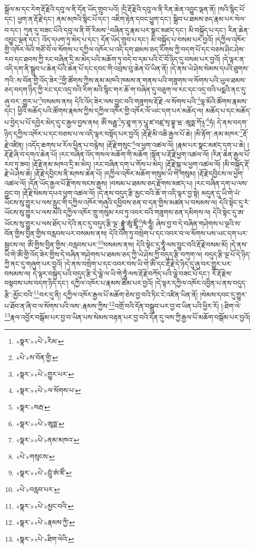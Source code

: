 སྒྲོལ་མ་དང་རེག་རྡོ་རྗེའི་དབུ་ལ་ནི་དོན་ཡོད་གྲུབ་པའོ། །དྲི་རྡོ་རྗེའི་དབུ་ལ་ནི་རིན་ཆེན་འབྱུང་ལྡན་ནོ། །སའི་སྙིང་པོ་དང་། ཕྱག་ན་རྡོ་རྗེ་དང་། ནམ་མཁའི་སྙིང་པོ་དང་། འཇིག་རྟེན་དབང་ཕྱུག་དང་། སྒྲིབ་པ་ཐམས་ཅད་རྣམ་པར་སེལ་བ་དང་། ཀུན་དུ་བཟང་པོའི་དབུ་ལ་ནི་གོ་རིམས་\footnote{«སྣར་»«པེ་»རིམ་}བཞིན་དུ་རྣམ་པར་སྣང་མཛད་དང་། མི་བསྐྱོད་པ་དང་། རིན་ཆེན་འབྱུང་ལྡན་དང་། འོད་དཔག་ཏུ་མེད་པ་དང་། དོན་ཡོད་གྲུབ་པ་དང་། མི་བསྐྱོད་པ་བསམ་པར་བྱའོ། །དཀྱིལ་འཁོར་གྱི་འཁོར་ལོའི་གཙོ་བོ་ལ་སོགས་པ་དཀྱིལ་འཁོར་པ་འདི་དག་ཐམས་ཅད་རིགས་ཀྱི་བདག་པོ་དང་བཅས་ཤིང་ཤེས་རབ་དང་ཐབས་ཀྱི་རང་བཞིན་དྲི་མ་མེད་པའི་མཆོག་ཏུ་བདེ་བ་དམ་པའི་ངོ་བོ་ཉིད་དུ་བསམ་པར་བྱའོ། །དེ་ལྟར་ན་འདི་དག་ནི་སྒྲུབ་པ་ཆེན་པོའི་ཆེན་པོ་དང་དབང་གི་འབྲས་བུ་ཆེན་པོ་ཡིན་ནོ། །དེ་ནས་ཡེ་ཤེས་སེམས་དཔའི་ཐུགས་ཀའི་:ས་བོན་གྱི་འོད་ཟེར་\footnote{«པེ་»ས་བོན་གྱི་}གྱི་ཚོགས་ཀྱིས་ནམ་མཁའི་ཁམས་ན་གནས་པའི་གཟུགས་ལ་སོགས་པའི་ཡུལ་ཐམས་ཅད་བདག་ཉིད་ཀྱི་རང་དང་འདྲ་བའི་རིག་མའི་སྙིང་གར་ཆོ་ག་བཞིན་དུ་བཅུག་ལ་རང་དང་འདྲ་བའི་པདྨའི་ནང་དུ་ཞུ་བར་:གྱུར་པ་\footnote{«སྣར་»«པེ་»གྱུར་པར་}བསམས་ནས། དེའི་འོད་ཟེར་ལས་བྱུང་བའི་གཟུགས་རྡོ་རྗེ་:ལ་སོགས་པའི་\footnote{«སྣར་»«པེ་»ལ་སོགས་པ་}ལྷ་མོའི་ཚོགས་རྣམས་དང་། ཕྱིའི་མཆོད་པའི་ཚོགས་རྣམས་ཀྱིས་དཀྱིལ་འཁོར་གྱི་འཁོར་ལོ་ཡང་དག་པར་མཆོད་ལ། མཆོད་པ་དང་མཆོད་པ་བྱེད་པ་པོ་དབྱེར་མེད་དུ་ང་རྒྱལ་བྱས་ནས། ཨོཾ་སརྦྦ་\footnote{«སྣར་»སརྦ་}ཏ་ཐཱ་ག་ཏ་པཱུ་ཛ་བཛྲ་སྭ་བྷཱ་ཝ་:ཨཱཏྨ་ཀོ྅་\footnote{«སྣར་»«པེ་»ཨཱཏྨ་}ཧཾ། དེ་ནས་བདག་ཉིད་དཀྱིལ་འཁོར་པ་དང་བཅས་པ་ལ་འདི་ལྟར་བསྟོད་པར་བྱའོ། །རྡོ་རྗེ་མི་འཆི་རྒྱལ་པོ་ཆེ། །མི་རྟོག་:ནམ་མཁར་\footnote{«སྣར་»«པེ་»ནམ་མཁའ་}རྡོ་རྗེ་འཛིན། །འདོད་ཆགས་ཕ་རོལ་ཕྱིན་པ་བརྙེས། །རྡོ་རྗེ་གསུང་\footnote{«པེ་»གསུངས་}ལ་ཕྱག་འཚལ་ལོ། །རྣམ་པར་སྣང་མཛད་དག་པ་ཆེ། །རྡོ་རྗེ་ཞི་བ་དགའ་ཆེན་པོ། །རང་བཞིན་འོད་གསལ་མཆོག་གི་མཆོག །སྟོན་པ་རྡོ་རྗེ་ཕྱག་འཚལ་ལོ། །རིན་ཆེན་རྒྱལ་པོ་རབ་ཏུ་ཟབ། །རྡོ་རྗེ་ནམ་མཁའ་དྲི་མ་མེད། །རང་བཞིན་དག་པ་གོས་པ་མེད། །རྡོ་རྗེ་སྐུ་ལ་ཕྱག་འཚལ་ལོ། །མི་བསྐྱོད་རྡོ་རྗེ་ཡེ་ཤེས་ཆེ། །རྡོ་རྗེ་དབྱིངས་ནི་མཁས་ཆེན་པོ། །དཀྱིལ་འཁོར་མཆོག་གསུམ་ཡི་གེ་གསུམ། །རྡོ་རྗེ་དབྱིངས་ལ་ཕྱག་འཚལ་ལོ། །དོན་ཡོད་རྒྱལ་པོ་རྫོགས་སངས་རྒྱས། །བསམ་པ་ཐམས་ཅད་རྫོགས་མཛད་པ། །རང་བཞིན་དག་པ་ལས་བྱུང་བ། །རྡོ་རྗེ་སེམས་དཔའ་ཕྱག་འཚལ་ལོ། །དེ་ནས་བདུད་རྩི་མྱང་བའི་ཆོ་ག་འདི་ལྟར་བྱ་སྟེ། མདུན་དུ་ཡི་གེ་ཡཾ་ཡོངས་སུ་གྱུར་པ་ལས་རླུང་གི་དཀྱིལ་འཁོར་གཞུའི་དབྱིབས་ཅན་བ་དན་གྱིས་མཚན་པ་བསམས་ལ། དེའི་སྟེང་དུ་རཾ་ཡོངས་སུ་གྱུར་པ་ལས་མེའི་དཀྱིལ་འཁོར་གྲུ་གསུམ་རབ་ཏུ་འབར་བའི་གཟུགས་ཅན་དམིགས་ལ། དེའི་སྟེང་དུ་ཨ་ཡོངས་སུ་གྱུར་པ་ལས་ཐོད་པ་དེའི་ནང་དུ་བདུད་རྩི་ལྔ་:བྷྲཱུཾ་ཨཱཾ་ཛྲཱིཾ་\footnote{«སྣར་»«པེ་»བྲུཾ་ཨཾ་ཛིཾ་}ཁཾ་ཧཱུྃ། ཞེས་བྱ་བ་དེ་བཞིན་གཤེགས་པ་ལྔའི་ས་བོན་གྱིས་བྱིན་གྱིས་བརླབས་པར་བསམས་ནས། དེའི་འོག་ཏུ་བསྲེག་པ་དང་འབར་བ་ལ་སོགས་པས་ཡང་དག་པར་སྦྱངས་ལ། ཨོཾ་གྱིས་བྱིན་གྱིས་:བརླབས་པར་\footnote{«པེ་»བརླབ་པར་}བསམས་ནས། དེའི་སྟེང་དུ་ཧཱུྃ་ལས་བྱུང་བའི་རྡོ་རྗེ་བསམ་མོ། །དེ་ནས་ཡི་གེ་ཨོཾ་གྱི་འོད་ཟེར་གྱིས་དེ་བཞིན་གཤེགས་པ་ཐམས་ཅད་ཀྱི་ཡེ་ཤེས་ཀྱི་བདུད་རྩི་བཀུག་ལ། བདུད་རྩི་ལྔ་པོ་དེ་ཉིད་ཀྱི་ནང་དུ་གཞུག་པར་བྱའོ། །དེ་ནས་བསྲེག་པ་དང་འབར་བས་ཡི་གེ་ཨོཾ་དང་རྡོ་རྗེ་དེ་ཉིད་དུ་ཞུ་བར་གྱུར་པར་བསམས་ལ། དེ་ལྟར་བསྐྱེད་པའི་བདུད་རྩི་དེ་ལྕེ་ལ་ཡི་གེ་ཧཱུྃ་ལས་རྡོ་རྗེ་བཀོད་པའི་ལྕེ་བཟང་པོ་དང་། རོ་རྡོ་རྗེས་བསྟབས་པས་བདག་ཉིད་དང་། དཀྱིལ་འཁོར་པ་རྣམས་ཚིམ་པར་བྱའོ། །དེ་ལྟར་དཀྱིལ་འཁོར་འབྱིན་པ་ནས་བདུད་རྩི་:མྱོང་བའི་\footnote{«སྣར་»«པེ་»མྱང་བའི་}བར་དུ་ནི། དཀྱིལ་འཁོར་རྒྱལ་པོ་མཆོག་ཅེས་བྱ་བའི་ཏིང་ངེ་འཛིན་ཡིན་ནོ། །སེམས་དབང་དུ་གྱུར་པ་ཐོབ་ན་ཞི་བ་ལ་སོགས་པའི་ལས་:རྣམས་ཀྱིས་\footnote{«སྣར་»«པེ་»རྣམས་ཀྱི་}འགྲོ་བའི་དོན་བསྒྲུབ་པར་བྱ་བ་ཡིན་པའི་ཕྱིར་རོ། །:ཐིག་ལེ་\footnote{«སྣར་»«པེ་»ཐིག་ལེའི་}རྣལ་འབྱོར་བསྒོམ་པར་བྱ་བ་ཡིན་པས་སེམས་བརྟན་པར་བྱ་བའི་དོན་དུ་ལས་ཀྱི་རྒྱལ་པོ་མཆོག་བསྒོམ་པར་བྱའོ། 
